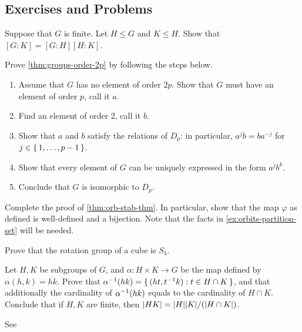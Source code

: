 \documentclass[./main.tex]{subfiles}
\begin{document}
\subsection{Exercises and Problems}

\begin{exercise}
    Suppose that $G$ is finite. Let $H \leq G$ and $K \leq H$. Show that $[G:K]
    = [G:H][H:K]$.
\end{exercise}

\begin{exercise}
\label{ex:prove-thm-classifying-order-2p}
    Prove \cref{thm:groups-order-2p} by following the steps below.
    \begin{enumerate}
        \item Assume that $G$ has no element of order $2p$. Show that $G$ must have an element of order $p$, call it $a$.
        \item Find an element of order 2, call it $b$.
        \item Show that $a$ and $b$ satisfy the relations of $D_p$: in particular, $a^j b = b a^{-j}$ for $j \in \set{1, \dots, p-1}$.
        \item Show that every element of $G$ can be uniquely expressed in the form $a^jb^k$. 
        \item Conclude that $G$ is isomorphic to $D_p$.
    \end{enumerate}
\end{exercise}

\begin{exercise}
\label{ex:orb-stab-thm}
Complete the proof of \cref{thm:orb-stab-thm}. In particular, show that the map
$\varphi$ as defined is well-defined and a bijection. Note that
the facts in \cref{ex:orbits-partition-set} will be needed.
\end{exercise}

\begin{exercise}
    Prove that the rotation group of a cube is $S_4$.
\end{exercise}

\begin{exercise}
\label{ex:generalization-of-hk-theorem}
    Let $H, K$ be subgroups of $G$, and $\alpha: H \times K \to G$ be the map
    defined by $\alpha(h, k) = hk$. Prove that $\alpha\inv \paren{hk} =
    \set{(ht, t\inv k): t \in H \cap K}$, and that additionally the cardinality
    of $\alpha\inv\paren{hk}$ equals to the cardinality of $H \cap K$. Conclude
    that if $H, K$ are finite, then $\abs{HK} = \abs H \abs K/(\abs{H \cap K})$.

    See \autocite[Exercise~9,\pno~58]{Jacobson_2009}
\end{exercise}
\end{document}
